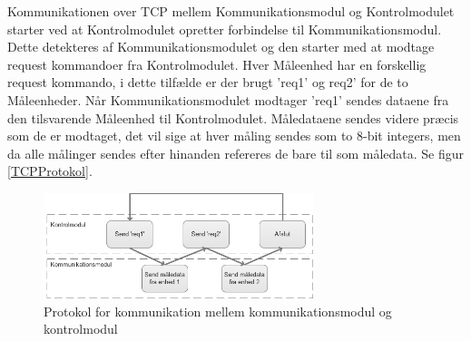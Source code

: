 Kommunikationen over TCP mellem Kommunikationsmodul og Kontrolmodulet starter ved at Kontrolmodulet opretter forbindelse til Kommunikationsmodul. Dette detekteres af Kommunikationsmodulet og den starter med at modtage request kommandoer fra Kontrolmodulet. Hver Måleenhed har en forskellig request kommando, i dette tilfælde er der brugt 'req1' og req2' for de to Måleenheder. Når Kommunikationsmodulet modtager 'req1' sendes dataene fra den tilsvarende Måleenhed til Kontrolmodulet. Måledataene sendes videre præcis som de er modtaget, det vil sige at hver måling sendes som to 8-bit integers, men da alle målinger sendes efter hinanden refereres de bare til som måledata. Se figur \ref{TCPProtokol}.

\begin{figure}[H] %
	\centering
	\includegraphics[width=0.7\textwidth]{Figure/TCPProtokol}
	\caption{Protokol for kommunikation mellem kommunikationsmodul og kontrolmodul}
	\label{fig:TCPProtokol}
\end{figure}



